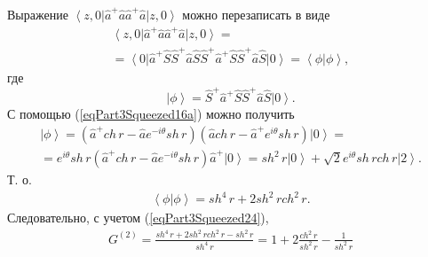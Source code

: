 Выражение
$\left<z,0\right|\hat{a}^{+}\hat{a}\hat{a}^{+}\hat{a}\left|z,0\right>$
можно перезаписать в виде
\begin{eqnarray}
  \left<z,0\right|\hat{a}^{+}\hat{a}\hat{a}^{+}\hat{a}\left|z,0\right>
  = \nonumber \\
  =
  \left<0\right|\hat{a}^{+}\hat{S}\hat{S}^{+}\hat{a}\hat{S}\hat{S}^{+}\hat{a}^{+}\hat{S}\hat{S}^{+}\hat{a}\hat{S}\left|0\right>
  = \left<\phi\right.\left|\phi\right>,
  \nonumber
\end{eqnarray}
где
\[
\left|\phi\right> = \hat{S}^{+}\hat{a}^{+}\hat{S}\hat{S}^{+}\hat{a}\hat{S}\left|0\right>.
\]
С помощью (\ref{eqPart3Squeezed16a}) можно получить
\begin{eqnarray}
  \left|\phi\right> =  
  \left(\hat{a}^{+} ch\,r - \hat{a} e^{-i\theta} sh \, r\right)
  \left(\hat{a} ch\,r - \hat{a}^{+} e^{i\theta} sh \, r\right)
  \left|0\right> =
  \nonumber \\
  =
   e^{i\theta} sh \, r \left(\hat{a}^{+} ch\,r - \hat{a} e^{-i\theta} sh \, r\right)
   \hat{a}^{+}\left|0\right> =
   sh^2 \, r \left|0\right> + \sqrt{2} e^{i\theta}  sh \, r ch \, r\left|2\right>.
  \nonumber
\end{eqnarray}
Т. о.
\begin{eqnarray}
  \left<\phi\right.\left|\phi\right> =
  sh^4 \, r + 2 sh^2 \, r ch^2 \, r.
  \nonumber
\end{eqnarray}
Следовательно, с учетом (\ref{eqPart3Squeezed24}),
\begin{eqnarray}
G^{(2)} = \frac{sh^4 \, r + 2 sh^2 \, r ch^2 \, r - sh^2 \, r}{sh^4 \,
  r} = 1 + 2 \frac{ch^2 \, r}{sh^2 \, r} - \frac{1}{sh^2 \, r}
\nonumber
\end{eqnarray}

